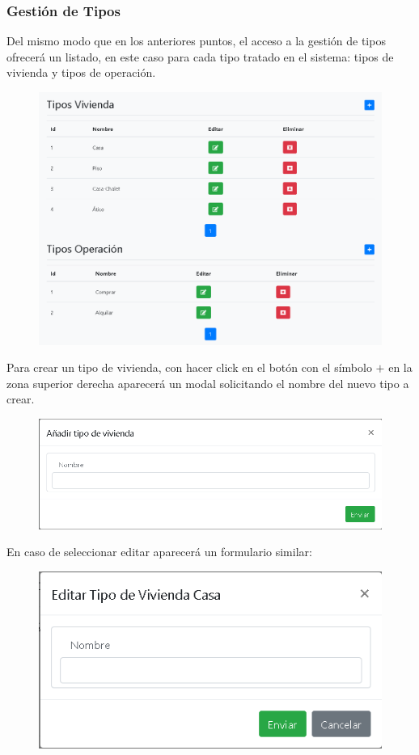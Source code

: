 \subsubsection{Gesti\'{o}n de Tipos}
Del mismo modo que en los anteriores puntos, el acceso a la gesti\'{o}n de tipos ofrecer\'{a} un listado, en este caso para cada tipo tratado en el sistema: tipos de vivienda y tipos de operaci\'{o}n. 

\begin{figure}[h!]
\centering
\includegraphics[width=.6\textwidth]{Img/ManualUsuario/ADMIN_TYPE.png}
\end{figure}

Para crear un tipo de vivienda, con hacer click en el bot\'{o}n con el s\'{i}mbolo $+$ en la zona superior derecha aparecer\'{a} un modal solicitando el nombre del nuevo tipo a crear.

\begin{figure}[h!]
\centering
\includegraphics[width=.6\textwidth]{Img/ManualUsuario/ADMIN_CREATE_THOUSING_TYPE.png}
\end{figure}
 
En caso de seleccionar editar aparecer\'{a} un formulario similar:

\begin{figure}[h!]
\centering
\includegraphics[width=.5\textwidth]{Img/ManualUsuario/ADMIN_EDIT_HOUSING_TYPE.png}
\end{figure}


